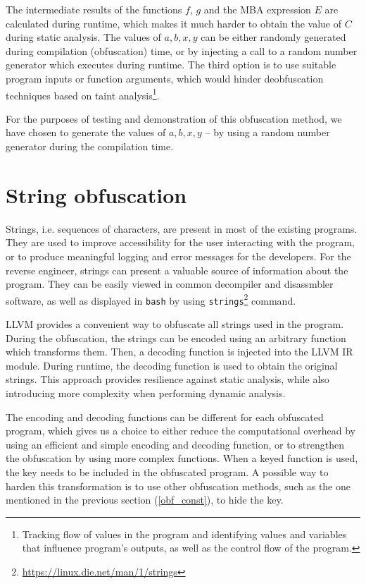 \documentclass[
  digital, %
  notable,   %
  twoside, %
  nolof,     %
  nolot,     %
]{fithesis3}
\theoremstyle{definition}
\begin{document}
The intermediate results of the functions $f$, $g$ and the MBA expression $E$ are calculated during runtime, which makes it much harder to obtain the value of $C$ during static analysis. The values of $a,b,x,y$ can be either randomly generated during compilation (obfuscation) time,  or by injecting a call to a random number generator which executes during runtime. The third option is to use suitable program inputs or function arguments, which would hinder deobfuscation techniques based on taint analysis\footnote{Tracking flow of values in the program and identifying values and variables that influence program's outputs, as well as the control flow of the program.}. 

For the purposes of testing and demonstration of this obfuscation method, we have chosen to generate the values of $a,b,x,y$ -- by using a random number generator during the compilation time.

\section{String obfuscation}

Strings, i.e. sequences of characters, are present in most of the existing programs. They are used to improve accessibility for the user interacting with the program, or to produce meaningful logging and error messages for the developers. For the reverse engineer, strings can present a valuable source of information about the program. They can be easily viewed in common decompiler and disassmbler software, as well as displayed in \texttt{bash} by using \texttt{strings}\footnote{\url{https://linux.die.net/man/1/strings}} command.

LLVM provides a convenient way to obfuscate all strings used in the program. During the obfuscation, the strings can be encoded using an arbitrary function which transforms them. Then, a decoding function is injected into the LLVM IR module. During runtime, the decoding function is used to obtain the original strings. This approach provides resilience against static analysis, while also introducing more complexity when performing dynamic analysis. 

The encoding and decoding functions can be different for each obfuscated program, which gives us a choice to either reduce the computational overhead by using an efficient and simple encoding and decoding function, or to strengthen the obfuscation by using more complex functions. When a keyed function is used, the key needs to be included in the obfuscated program. A possible way to harden this transformation is to use other obfuscation methods, such as the one mentioned in the previous section (\ref{obf_const}), to hide the key.
\end{document}

